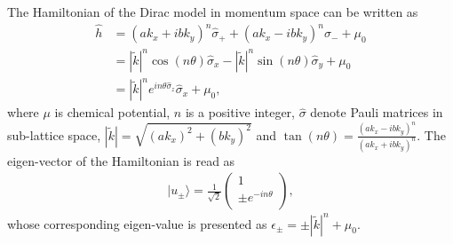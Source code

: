 \documentclass{article}
\begin{document}
The Hamiltonian of the Dirac model in momentum space can be written as 
\begin{align}
    \hat{h} &= \left(a k_x + ib k_y\right)^n \hat{\sigma}_+ + \left(a k_x - ib k_y\right)^n \hat{\sigma}_- + \mu_0 \\
            &= |\widetilde{k}|^n \cos(n \theta) \hat{\sigma}_x - |\widetilde{k}|^n \sin(n \theta) \hat{\sigma}_y + \mu_0\\
            &= |\widetilde{k}|^n e^{in \theta \hat{\sigma}_z}\hat{\sigma}_x + \mu_0,  
\end{align}
where $ \mu $ is chemical potential, $ n $ is a positive integer, $ \hat{\sigma} $ denote Pauli matrices in sub-lattice space, $ |\widetilde{k}|= \sqrt{(a k_x)^2 + (b k_y)^2 }   $ and $ \tan(n \theta) = \frac{(ak_x-ibk_y)^n}{(ak_x+ibk_y)^n} $. The eigen-vector of the Hamiltonian is read as 
\begin{align}
    |u_\pm\rangle = \frac{1}{\sqrt{2} } \left(\begin{array}{c}
         1 \\
         \pm e^{-in \theta} \\
    \end{array}\right),
\end{align}
whose corresponding eigen-value is presented as $ \epsilon_{\pm} = \pm |\widetilde{k}|^n + \mu_0   $. 
\end{document}
